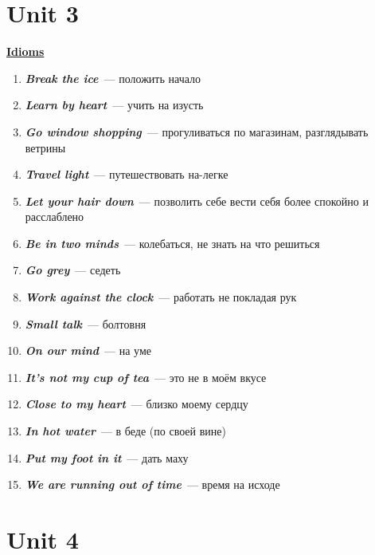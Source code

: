 \documentclass[10pt,a4paper]{article}
\newcommand\ex[1]{\textit{\textbf{{#1}}}}
\begin{document}
\section{Unit 3}
\textbf{\underline{Idioms}}

\begin{enumerate}
  \item \ex{Break the ice}~--- положить начало 
  \item \ex{Learn by heart}~--- учить на изусть
  \item \ex{Go window shopping}~--- прогуливаться по магазинам, разглядывать ветрины
  \item \ex{Travel light}~--- путешествовать на-легке
  \item \ex{Let your hair down}~--- позволить себе вести себя более спокойно и расслаблено
  \item \ex{Be in two minds}~--- колебаться, не знать на что решиться
  \item \ex{Go grey}~--- седеть
  \item \ex{Work against the clock}~--- работать не покладая рук
  \item \ex{Small talk}~--- болтовня
  \item \ex{On our mind}~--- на уме
  \item \ex{It's not my cup of tea}~--- это не в моём вкусе
  \item \ex{Close to my heart}~--- близко моему сердцу
  \item \ex{In hot water}~--- в беде (по своей вине)
  \item \ex{Put my foot in it}~--- дать маху
  \item \ex{We are running out of time}~--- время на исходе
\end{enumerate}

 
 


\section{Unit 4}
\end{document}
